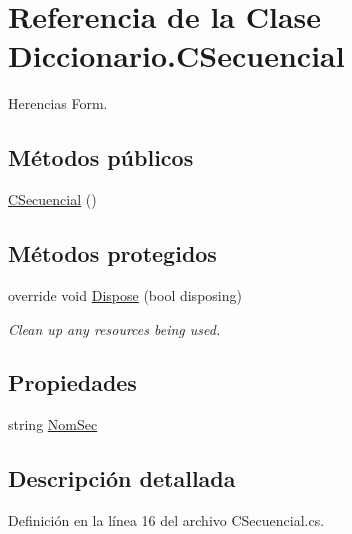 \hypertarget{class_diccionario_1_1_c_secuencial}{\section{Referencia de la Clase Diccionario.\-C\-Secuencial}
\label{class_diccionario_1_1_c_secuencial}
}


Herencias Form.

\subsection*{Métodos públicos}
\begin{DoxyCompactItemize}
\item 
\hyperlink{class_diccionario_1_1_c_secuencial_a71031255bbea7f902cc3adc5b2065fc9}{C\-Secuencial} ()
\end{DoxyCompactItemize}
\subsection*{Métodos protegidos}
\begin{DoxyCompactItemize}
\item 
override void \hyperlink{class_diccionario_1_1_c_secuencial_af4b833d8d7a9324d72cdb05918acdf23}{Dispose} (bool disposing)
\begin{DoxyCompactList}\small\item\em Clean up any resources being used. \end{DoxyCompactList}\end{DoxyCompactItemize}
\subsection*{Propiedades}
\begin{DoxyCompactItemize}
\item 
string \hyperlink{class_diccionario_1_1_c_secuencial_a4a21e095e189f2569dcf83fcfc3eb18e}{Nom\-Sec}
\end{DoxyCompactItemize}


\subsection{Descripción detallada}


Definición en la línea 16 del archivo C\-Secuencial.\-cs.




